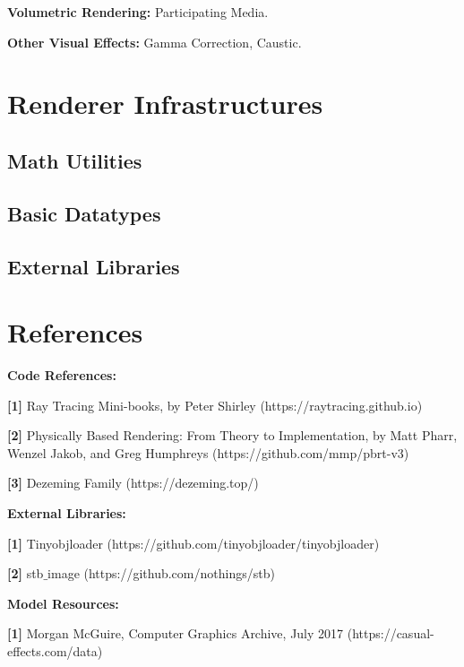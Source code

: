 \documentclass[utf8]{article}
\begin{document}
\noindent
\textbf{Volumetric Rendering: } Participating Media.

\noindent
\textbf{Other Visual Effects: } Gamma Correction, Caustic.

\section{Renderer Infrastructures}

\subsection{Math Utilities}

\subsection{Basic Datatypes}

\subsection{External Libraries}










\section{References}
\noindent
\textbf{Code References: }

\noindent
\textbf{[1]} Ray Tracing Mini-books, by Peter Shirley (https://raytracing.github.io)

\noindent
\textbf{[2]} Physically Based Rendering: From Theory to Implementation, by Matt Pharr, Wenzel Jakob, and Greg Humphreys (https://github.com/mmp/pbrt-v3)

\noindent
\textbf{[3]} Dezeming Family (https://dezeming.top/)

\noindent
\textbf{External Libraries: }

\noindent
\textbf{[1]} Tinyobjloader (https://github.com/tinyobjloader/tinyobjloader)

\noindent
\textbf{[2]} stb$\_$image (https://github.com/nothings/stb)

\noindent
\textbf{Model Resources: }

\noindent
\textbf{[1]} Morgan McGuire, Computer Graphics Archive, July 2017 (https://casual-effects.com/data)
\end{document}
